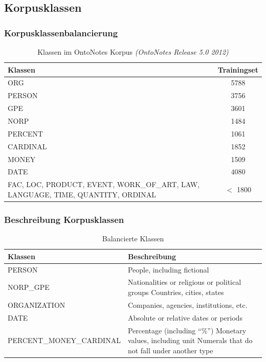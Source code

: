 \documentclass{beamer}
\begin{document}
	\subsection{Korpusklassen}
		\begin{frame}
			\frametitle{Korpusklassenbalancierung}
				\begin{table}
				\caption{Klassen im OntoNotes Korpus \textit{(OntoNotes Release 5.0 2012)}}
				\begin{tabularx}{\textwidth}{Xc}
					\toprule
					Klassen  & Trainingset \\
					\midrule
					ORG  & 5788 \\
					PERSON & 3756 \\
					GPE & 3601 \\
					NORP & 1484 \\
					PERCENT & 1061  \\
					CARDINAL & 1852 \\
					MONEY & 1509  \\
					DATE & 4080  \\
					FAC, LOC, PRODUCT, EVENT, WORK\_OF\_ART, LAW, LANGUAGE, TIME, QUANTITY, ORDINAL & $<$ 1800 \\
					\bottomrule
				\end{tabularx}
				\label{tab:datasets}
			\end{table}
		\end{frame}
	\begin{frame}
		\frametitle{Beschreibung Korpusklassen}
		\begin{table}
			\caption{Balancierte Klassen}
			\begin{tabularx}{\textwidth}{lX}
				\toprule
				Klassen  & Beschreibung \\
				\midrule
				PERSON 	& People, including fictional \\
				NORP\_GPE &	Nationalities or religious or political groups
				Countries, cities, states\\
				ORGANIZATION &	Companies, agencies, institutions, etc.\\
				DATE &	Absolute or relative dates or periods\\
				PERCENT\_MONEY\_CARDINAL &	Percentage (including “\%”)
				Monetary values, including unit
				Numerals that do not fall under another type \\
				\bottomrule
			\end{tabularx}
			\label{tab:datasets}
		\end{table}
	\end{frame}
	
\end{document}
